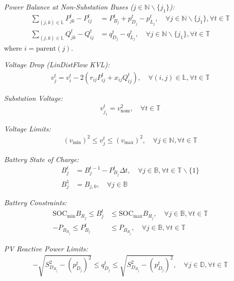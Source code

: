 \textit{Power Balance at Non-Substation Buses ($j \in \mathbb{N} \backslash \{j_1\}$):}
\begin{align}
    \sum_{(j, k) \in \mathbb{L}} P_{jk}^t - P_{ij}^t &= P_{B_j}^t + p_{D_j}^t - p_{L_j}^t, \quad \forall j \in \mathbb{N} \backslash \{j_1\}, \forall t \in \mathbb{T} \label{eq:node_real} \\
    \sum_{(j, k) \in \mathbb{L}} Q_{jk}^t - Q_{ij}^t &= q_{D_j}^t - q_{L_j}^t, \quad \forall j \in \mathbb{N} \backslash \{j_1\}, \forall t \in \mathbb{T} \label{eq:node_reactive}
\end{align}
where $i = \text{parent}(j)$.

\textit{Voltage Drop (LinDistFlow KVL):}
\begin{align}
    v_j^t = v_i^t - 2(r_{ij}P_{ij}^t + x_{ij}Q_{ij}^t), \quad \forall (i,j) \in \mathbb{L}, \forall t \in \mathbb{T} \label{eq:kvl}
\end{align}

\textit{Substation Voltage:}
\begin{align}
    v_{j_1}^t = v_{\text{nom}}^2, \quad \forall t \in \mathbb{T} \label{eq:subs_voltage}
\end{align}

\textit{Voltage Limits:}
\begin{align}
    (v_{\min})^2 \leq v_j^t \leq (v_{\max})^2, \quad \forall j \in \mathbb{N}, \forall t \in \mathbb{T} \label{eq:voltage_limits}
\end{align}

\textit{Battery State of Charge:}
\begin{align}
    B_j^t &= B_j^{t-1} - P_{B_j}^t \Delta t, \quad \forall j \in \mathbb{B}, \forall t \in \mathbb{T} \backslash \{1\} \label{eq:battery_soc} \\
    B_j^1 &= B_{j,0}, \quad \forall j \in \mathbb{B} \label{eq:battery_init}
\end{align}

\textit{Battery Constraints:}
\begin{align}
    \text{SOC}_{\min} B_{R_j} \leq B_j^t &\leq \text{SOC}_{\max} B_{R_j}, \quad \forall j \in \mathbb{B}, \forall t \in \mathbb{T} \label{eq:battery_soc_limits} \\
    -P_{B_{R_j}} \leq P_{B_j}^t &\leq P_{B_{R_j}}, \quad \forall j \in \mathbb{B}, \forall t \in \mathbb{T} \label{eq:battery_power_limits}
\end{align}

\textit{PV Reactive Power Limits:}
\begin{align}
    -\sqrt{S_{D_{R_j}}^2 - (p_{D_j}^t)^2} \leq q_{D_j}^t \leq \sqrt{S_{D_{R_j}}^2 - (p_{D_j}^t)^2}, \quad \forall j \in \mathbb{D}, \forall t \in \mathbb{T} \label{eq:pv_reactive}
\end{align}

